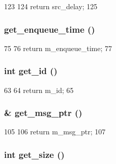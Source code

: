 \begin{DoxyCode}
123 {
124     return src_delay;
125 }
\end{DoxyCode}
\hypertarget{classflit_a8b7947d2d5ef2f4c39d644d6b8070acb}{
\subsubsection[{get\_\-enqueue\_\-time}]{ get\_\-enqueue\_\-time ()}}
\label{classflit_a8b7947d2d5ef2f4c39d644d6b8070acb}



\begin{DoxyCode}
75 {
76     return m_enqueue_time;
77 }
\end{DoxyCode}
\hypertarget{classflit_a1f0b8f09abd10342468ce33a1da15557}{
\subsubsection[{get\_\-id}]{\setlength{\rightskip}{0pt plus 5cm}int get\_\-id ()}}
\label{classflit_a1f0b8f09abd10342468ce33a1da15557}



\begin{DoxyCode}
63 {
64     return m_id;
65 }
\end{DoxyCode}
\hypertarget{classflit_a7bd37ca8e08e69b8f718e66d1a1e28b1}{
\subsubsection[{get\_\-msg\_\-ptr}]{ \& get\_\-msg\_\-ptr ()}}
\label{classflit_a7bd37ca8e08e69b8f718e66d1a1e28b1}



\begin{DoxyCode}
105 {
106     return m_msg_ptr;
107 }
\end{DoxyCode}
\hypertarget{classflit_a885808baa3d930eac7a825f7d49f73d7}{
\subsubsection[{get\_\-size}]{\setlength{\rightskip}{0pt plus 5cm}int get\_\-size ()}}
\label{classflit_a885808baa3d930eac7a825f7d49f73d7}



